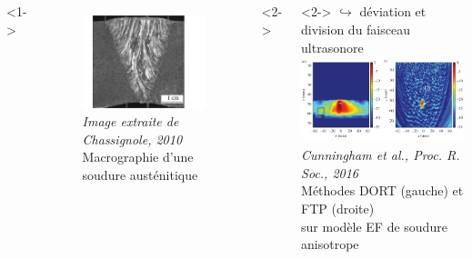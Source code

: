 \subsection*{}
\begin{frame}{\insertsectionhead}
\begin{small}
\vspace{-0.5cm}
\hspace{1cm}
	\begin{columns}[c]
			<1->
			\centering
			\begin{figure}
				\includegraphics[height=2.7cm]{./img/soudure1.png}\\
				{\tiny{ \itshape Image extraite de Chassignole, 2010} \\ \centering \scriptsize Macrographie d'une soudure austénitique  }
			\end{figure}
			<2->
			\hspace{-2.8cm}
			\vspace{2.5cm}
			<2->
			\hspace{-1cm}
			$\hookrightarrow$ déviation et division du faisceau ultrasonore\\[0.2cm]
			\hspace{-0.5cm}
			\hspace{1cm}\includegraphics[height=2.5cm]{img/tfm_dort.png}\\
			{\tiny{ \itshape  \hspace{1.7cm} Cunningham et al., Proc. R. Soc., 2016} \\[0.2cm] \hspace{1cm} \scriptsize Méthodes DORT (gauche) et FTP (droite)\\[-0.1cm] \hspace{1.5cm}sur modèle EF de soudure anisotrope }
				

\end{columns}
\end{small}
\end{frame}
